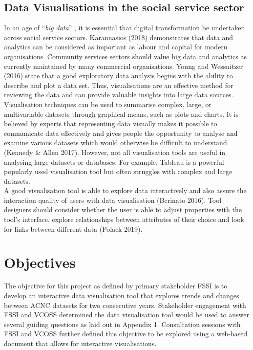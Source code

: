 \documentclass[
  11pt,
]{article}
\begin{document}
\hypertarget{data-visualisations-in-the-social-service-sector}{%
\subsection{Data Visualisations in the social service sector}\label{data-visualisations-in-the-social-service-sector}}

In an age of ``\emph{big data}'' , it is essential that digital transformation be undertaken across social service sectors. Karannasios (2018) demonstrates that data and analytics can be considered as important as labour and capital for modern organisations. Community services sectors should value big data and analytics as currently maintained by many commercial organisations. Young and Wessnitzer (2016) state that a good exploratory data analysis begins with the ability to describe and plot a data set. Thus, visualisations are an effective method for reviewing the data and can provide valuable insights into large data sources.\\
Visualisation techniques can be used to summarise complex, large, or multivariable datasets through graphical means, such as plots and charts. It is believed by experts that representing data visually makes it possible to communicate data effectively and gives people the opportunity to analyse and examine various datasets which would otherwise be difficult to understand (Kennedy \& Allen 2017). However, not all visualisation tools are useful in analysing large datasets or databases. For example, Tableau is a powerful popularly used visualisation tool but often struggles with complex and large datasets.\\
A good visualisation tool is able to explore data interactively and also assure the interaction quality of users with data visualisation (Berinato 2016). Tool designers should consider whether the user is able to adjust properties with the tool's interface, explore relationships between attributes of their choice and look for links between different data (Polack 2019).

\hypertarget{objectives}{%
\section{Objectives}\label{objectives}}

The objective for this project as defined by primary stakeholder FSSI is to develop an interactive data visualisation tool that explores trends and changes between ACNC datasets for two consecutive years.
Stakeholder engagement with FSSI and VCOSS determined the data visualisation tool would be used to answer several guiding questions as laid out in Appendix 1. Consultation sessions with FSSI and VCOSS further defined this objective to be explored using a web-based document that allows for interactive visualisations.
\end{document}
